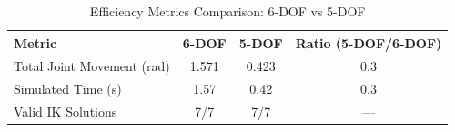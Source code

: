 
\begin{table}[htbp]
\centering
\caption{Efficiency Metrics Comparison: 6-DOF vs 5-DOF}
\label{tab:efficiency}
\begin{tabular}{lccc}
\hline
\textbf{Metric} & \textbf{6-DOF} & \textbf{5-DOF} & \textbf{Ratio (5-DOF/6-DOF)} \\
\hline
Total Joint Movement (rad) & 1.571 & 0.423 & 0.3 \\
Simulated Time (s) & 1.57 & 0.42 & 0.3 \\
Valid IK Solutions & 7/7 & 7/7 & — \\
\hline
\end{tabular}
\end{table}
